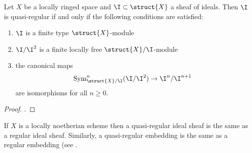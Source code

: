 \documentclass[12pt]{article}
\begin{document}
\begin{lemma}
Let $X$ be a locally ringed space and $\I \subset \struct{X}$ a sheaf of ideals. Then $\I$ is quasi-regular if and only if the following conditions are satisfied:
\begin{enumerate}
\item $\I$ is a finite type $\struct{X}$-module
\item $\I / \I^2$ is a finite locally free $\struct{X} / \I$-module
\item the canonical maps
\[ \mathrm{Sym}^n_{\struct{X}/ \I}(\I / \I^2) \to \I^n / \I^{n+1} \]
are isomorphisms for all $n \ge 0$.
\end{enumerate}
\end{lemma}

\begin{proof}
.
\end{proof}

\begin{rmk}
If $X$ is a locally noetherian scheme then a quasi-regular ideal sheaf is the same as a regular ideal sheaf. Similarly, a quasi-regular embedding is the same as a regular embedding (see .
\end{rmk}
\end{document}
